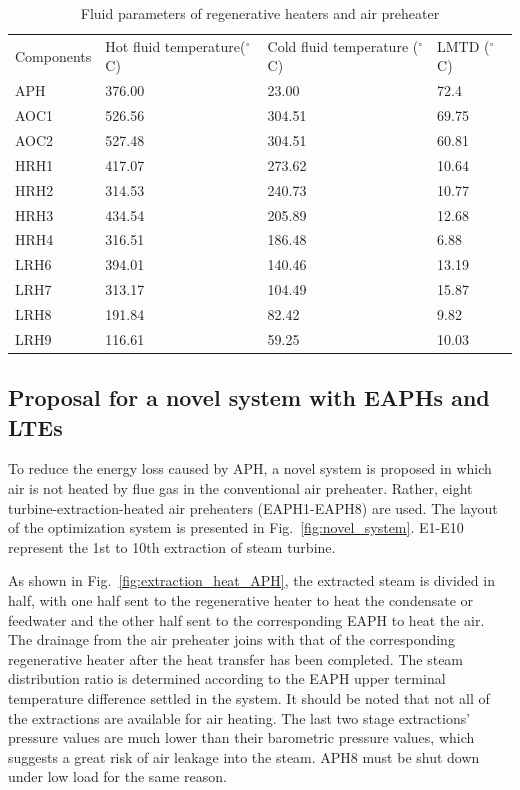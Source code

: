 \documentclass[preprint,12pt]{elsarticle}
\begin{document}
\begin{table}[htbp]
\caption{Fluid parameters of regenerative heaters and air preheater} %
\label{tab:reheater parameter}
\centering
\begin{tabular}{llll}
\toprule 
\multirow{2}{2cm}{Components} &\multirow{2}{2.7cm}{Hot fluid temperature($^\circ$C)}  & \multirow{2}{3.2cm}{Cold fluid temperature ($^\circ$C)}&\multirow{2}{2.2cm}{LMTD ($^\circ$C)}\tabularnewline
&&&\tabularnewline
\midrule
APH  &  376.00 	& 23.00  & 72.4\tabularnewline
AOC1 &   526.56 & 304.51 & 69.75\tabularnewline
AOC2 &  527.48 	& 304.51 & 60.81\tabularnewline
HRH1 &   417.07 & 273.62 & 10.64\tabularnewline
HRH2 &   314.53 & 240.73 & 10.77\tabularnewline
HRH3 &   434.54 & 205.89 & 12.68\tabularnewline
HRH4 &   316.51 & 186.48 & 6.88\tabularnewline
LRH6 &  394.01 	& 140.46 & 13.19\tabularnewline
LRH7 &   313.17 & 104.49 & 15.87\tabularnewline
LRH8 &   191.84 & 82.42  & 9.82\tabularnewline
LRH9 &   116.61 & 59.25  & 10.03\tabularnewline
\bottomrule
\end{tabular}
\end{table}




\subsection{Proposal for a novel system with EAPHs and LTEs}
\label{sub2:prop novel sys}

To reduce the energy loss caused by APH, a novel system is proposed in which air is not heated by flue gas in the conventional air preheater. Rather, eight turbine-extraction-heated air preheaters (EAPH1-EAPH8) are used.
The layout of the optimization system is presented in Fig.~\ref{fig:novel_system}.
E1-E10 represent the 1st to 10th extraction of steam turbine.

As shown in Fig.~\ref{fig:extraction_heat_APH}, the extracted steam is divided in half, with one half sent to the regenerative heater to heat the condensate or feedwater and the other half sent to the corresponding EAPH to heat the air.
The drainage from the air preheater joins with that of the corresponding regenerative heater after the heat transfer has been completed.
The steam distribution ratio is determined according to the EAPH upper terminal temperature difference settled in the system.
It should be noted that not all of the extractions are available for air heating.
The last two stage extractions' pressure values are much lower than their barometric pressure values, which suggests a great risk of air leakage into the steam. APH8 must be shut down under low load for the same reason.
\end{document}
